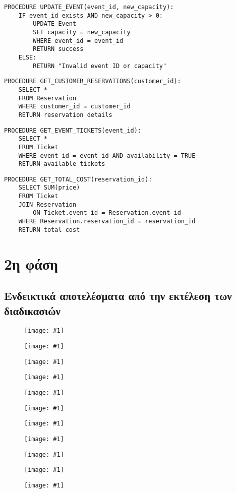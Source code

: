 \documentclass[a4paper, 11pt]{article}
\newcommand{\includeimage}[2]{
    \begin{figure}[H]
        \centering
        \texttt{[image: \#1]}
        \if\relax\detokenize{#2}\relax
        \else
            \caption{#2}
        \fi
    \end{figure}
}
\begin{document}
\begin{verbatim}
PROCEDURE UPDATE_EVENT(event_id, new_capacity):
    IF event_id exists AND new_capacity > 0:
        UPDATE Event 
        SET capacity = new_capacity 
        WHERE event_id = event_id
        RETURN success
    ELSE:
        RETURN "Invalid event ID or capacity"
\end{verbatim}      
\begin{verbatim}
PROCEDURE GET_CUSTOMER_RESERVATIONS(customer_id):
    SELECT * 
    FROM Reservation 
    WHERE customer_id = customer_id
    RETURN reservation details
\end{verbatim}  
\begin{verbatim}
PROCEDURE GET_EVENT_TICKETS(event_id):
    SELECT * 
    FROM Ticket 
    WHERE event_id = event_id AND availability = TRUE
    RETURN available tickets
\end{verbatim} 
\begin{verbatim}
PROCEDURE GET_TOTAL_COST(reservation_id):
    SELECT SUM(price) 
    FROM Ticket 
    JOIN Reservation 
        ON Ticket.event_id = Reservation.event_id
    WHERE Reservation.reservation_id = reservation_id
    RETURN total cost
\end{verbatim}
\section*{2η φάση}
\subsection*{Ενδεικτικά αποτελέσματα από την εκτέλεση των διαδικασιών}
\includeimage{images/add_customer_try.png}{}
\includeimage{images/add_customer_res.png}{}
\includeimage{images/add_event_try.png}{}
\includeimage{images/add_event_res.png}{}
\includeimage{images/book_tickets_try.png}{}
\includeimage{images/book_tickets_res.png}{}
\includeimage{images/search_available_seats.png}{}
\includeimage{images/view_profits.png}{}
\includeimage{images/active_reservations.png}{}
\includeimage{images/most_popular_event.png}{}
\includeimage{images/event_highest_profit.png}{}
\end{document}
